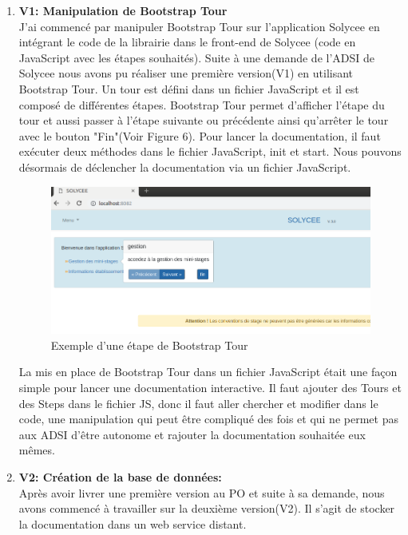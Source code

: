\documentclass[12pt]{article}
\begin{document}
\begin{enumerate}

\item \textbf{V1: Manipulation de Bootstrap Tour }\\

J'ai commencé par manipuler Bootstrap Tour sur l'application Solycee en intégrant le code de la librairie dans le front-end de Solycee (code en JavaScript avec les étapes souhaités). Suite à une demande de l'ADSI de Solycee nous avons pu réaliser une première version(V1) en utilisant Bootstrap Tour. Un tour est défini dans un fichier JavaScript et il est composé de différentes étapes. Bootstrap Tour permet d'afficher l'étape du tour et aussi passer à l'étape suivante ou précédente ainsi qu'arrêter le tour avec le bouton "Fin"(Voir Figure 6). Pour lancer la documentation, il faut exécuter deux méthodes dans le fichier JavaScript, init et start. Nous pouvons désormais de déclencher la documentation via un fichier JavaScript.
\begin{figure}[H]
	\centering
 		\includegraphics[width=1\textwidth]{diagrammes/exemple_Tour.png} 
  		\caption{Exemple d'une étape de Bootstrap Tour}
	\end{figure}


La mis en place de Bootstrap Tour dans un fichier JavaScript était une façon simple pour lancer une documentation interactive. Il faut ajouter des Tours et des Steps dans le fichier JS, donc il faut aller chercher et modifier dans le code, une manipulation qui peut être compliqué des fois et qui ne permet pas aux ADSI d'être autonome et rajouter la documentation souhaitée eux mêmes.

\item \textbf{V2: Création de la base de données: }\\

Après avoir livrer une première version au PO et suite à sa demande, nous avons commencé à travailler sur la deuxième version(V2). Il s'agit de stocker la documentation dans un web service distant. 


\end{enumerate}
\end{document}
